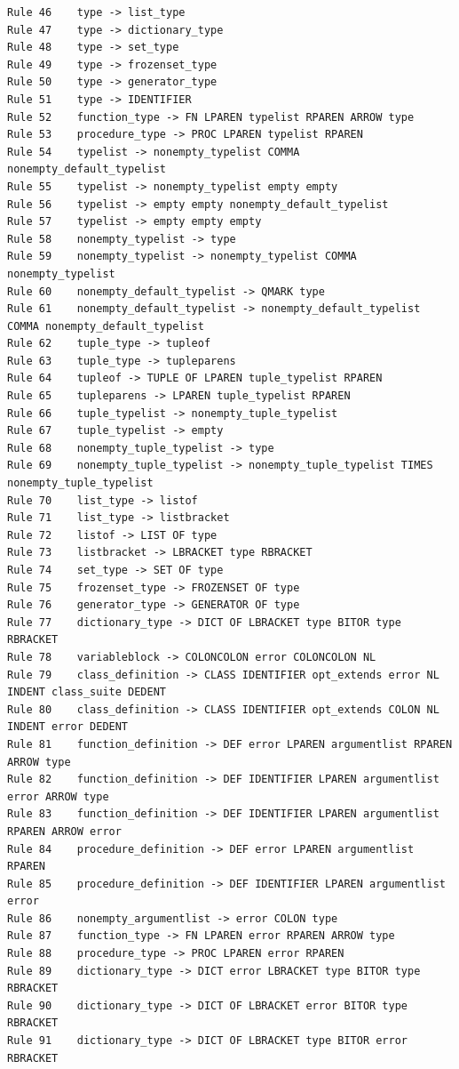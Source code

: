 \documentclass{article}
\begin{document}
\begin{verbatim}
Rule 46    type -> list_type
Rule 47    type -> dictionary_type
Rule 48    type -> set_type
Rule 49    type -> frozenset_type
Rule 50    type -> generator_type
Rule 51    type -> IDENTIFIER
Rule 52    function_type -> FN LPAREN typelist RPAREN ARROW type
Rule 53    procedure_type -> PROC LPAREN typelist RPAREN
Rule 54    typelist -> nonempty_typelist COMMA nonempty_default_typelist
Rule 55    typelist -> nonempty_typelist empty empty
Rule 56    typelist -> empty empty nonempty_default_typelist
Rule 57    typelist -> empty empty empty
Rule 58    nonempty_typelist -> type
Rule 59    nonempty_typelist -> nonempty_typelist COMMA nonempty_typelist
Rule 60    nonempty_default_typelist -> QMARK type
Rule 61    nonempty_default_typelist -> nonempty_default_typelist COMMA nonempty_default_typelist
Rule 62    tuple_type -> tupleof
Rule 63    tuple_type -> tupleparens
Rule 64    tupleof -> TUPLE OF LPAREN tuple_typelist RPAREN
Rule 65    tupleparens -> LPAREN tuple_typelist RPAREN
Rule 66    tuple_typelist -> nonempty_tuple_typelist
Rule 67    tuple_typelist -> empty
Rule 68    nonempty_tuple_typelist -> type
Rule 69    nonempty_tuple_typelist -> nonempty_tuple_typelist TIMES nonempty_tuple_typelist
Rule 70    list_type -> listof
Rule 71    list_type -> listbracket
Rule 72    listof -> LIST OF type
Rule 73    listbracket -> LBRACKET type RBRACKET
Rule 74    set_type -> SET OF type
Rule 75    frozenset_type -> FROZENSET OF type
Rule 76    generator_type -> GENERATOR OF type
Rule 77    dictionary_type -> DICT OF LBRACKET type BITOR type RBRACKET
Rule 78    variableblock -> COLONCOLON error COLONCOLON NL
Rule 79    class_definition -> CLASS IDENTIFIER opt_extends error NL INDENT class_suite DEDENT
Rule 80    class_definition -> CLASS IDENTIFIER opt_extends COLON NL INDENT error DEDENT
Rule 81    function_definition -> DEF error LPAREN argumentlist RPAREN ARROW type
Rule 82    function_definition -> DEF IDENTIFIER LPAREN argumentlist error ARROW type
Rule 83    function_definition -> DEF IDENTIFIER LPAREN argumentlist RPAREN ARROW error
Rule 84    procedure_definition -> DEF error LPAREN argumentlist RPAREN
Rule 85    procedure_definition -> DEF IDENTIFIER LPAREN argumentlist error
Rule 86    nonempty_argumentlist -> error COLON type
Rule 87    function_type -> FN LPAREN error RPAREN ARROW type
Rule 88    procedure_type -> PROC LPAREN error RPAREN
Rule 89    dictionary_type -> DICT error LBRACKET type BITOR type RBRACKET
Rule 90    dictionary_type -> DICT OF LBRACKET error BITOR type RBRACKET
Rule 91    dictionary_type -> DICT OF LBRACKET type BITOR error RBRACKET
\end{verbatim}
\pagebreak
\end{document}
